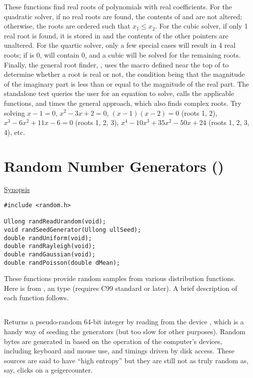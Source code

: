 These functions find real roots of polynomials with real coefficients.
For the quadratic solver, if no real roots are found, the contents of
 and  are not altered; otherwise, the roots are
ordered such that $x_1 \le x_2$.  For the cubic solver, if only 1 real
root is found, it is stored in  and the contents of the other
pointers are unaltered.  For the quartic solver, only a few special
cases will result in 4 real roots; if  is 0,  will
contain 0, and a cubic will be solved for the remaining roots.
Finally, the general root finder, , uses the
macro  defined near the top of  to
determine whether a root is real or not, the condition being that the
magnitude of the imaginary part is less than or equal to the magnitude
of the real part.  The standalone test queries the user for an
equation to solve, calls the applicable functions, and times the
general approach, which also finds complex roots.  Try solving $x - 1
= 0$, $x^2 - 3 x + 2 = 0$, \ie $(x - 1)(x - 2) = 0$ (roots 1, 2), $x^3
- 6 x^2 + 11 x - 6 = 0$ (roots 1, 2, 3), $x^4 - 10 x^3 + 35 x^2 - 50
x + 24$ (roots 1, 2, 3, 4), etc.

\section{Random Number Generators ()}

\noindent\underline{Synopsis}

\begin{verbatim}
#include <random.h>

Ullong randReadUrandom(void);
void randSeedGenerator(Ullong ullSeed);
double randUniform(void);
double randRayleigh(void);
double randGaussian(void);
double randPoisson(double dMean);
\end{verbatim}

These functions provide random samples from various distribution
functions.  Here  is  from
, \ie an  type (requires C99
standard or later).  A brief description of each function follows.

\subsection{}

Returns a pseudo-random 64-bit integer by reading from the device
, which is a handy way of seeding the generators
(but too slow for other purposes).  Random bytes are generated in
 based on the operation of the computer’s devices,
including keyboard and mouse use, and timings driven by disk access.
These sources are said to have ``high entropy'' but they are still not
as truly random as, say, clicks on a geigercounter.

